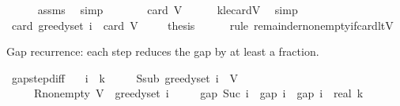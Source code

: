 \begin{isabellebody}
\ \ \ \ \isamarkupfalse%
\ assms\ \isamarkupfalse%
\ simp\isanewline
\ \ \isamarkupfalse%
\ \isamarkupfalse%
\ {\isachardoublequoteopen}{\isachardot}{\kern0pt}{\isachardot}{\kern0pt}{\isachardot}{\kern0pt}\ {\isasymle}\ card\ V{\isachardoublequoteclose}\isanewline
\ \ \ \ \isamarkupfalse%
\ k{\isacharunderscore}{\kern0pt}le{\isacharunderscore}{\kern0pt}cardV\ \isamarkupfalse%
\ simp\isanewline
\ \ \isamarkupfalse%
\ \isamarkupfalse%
\ {\isachardoublequoteopen}card\ {\isacharparenleft}{\kern0pt}greedy{\isacharunderscore}{\kern0pt}set\ i{\isacharparenright}{\kern0pt}\ {\isacharless}{\kern0pt}\ card\ V{\isachardoublequoteclose}\ \isakeywordONE{{\isachardot}{\kern0pt}}\isamarkupfalse%
\isanewline
\ \ \isamarkupfalse%
\ {\isacharquery}{\kern0pt}thesis\isanewline
\ \ \ \ \isamarkupfalse%
\ {\isacharparenleft}{\kern0pt}rule\ remainder{\isacharunderscore}{\kern0pt}nonempty{\isacharunderscore}{\kern0pt}if{\isacharunderscore}{\kern0pt}card{\isacharunderscore}{\kern0pt}ltV{\isacharparenright}{\kern0pt}\isanewline
{}\isamarkupfalse%
%
\endisatagproof
{\isafoldproof}%
%
\isadelimproof
%
\endisadelimproof
%
\begin{isamarkuptext}%
Gap recurrence: each step reduces the gap by at least a  fraction.%
\end{isamarkuptext}\isamarkuptrue%
\isamarkupfalse%
\ gap{\isacharunderscore}{\kern0pt}step{\isacharunderscore}{\kern0pt}diff{\isacharcolon}{\kern0pt}\isanewline
\ \ \ {\isachardoublequoteopen}i\ {\isacharless}{\kern0pt}\ k{\isachardoublequoteclose}\isanewline
\ \ \ \ \ S{\isacharunderscore}{\kern0pt}sub{\isacharcolon}{\kern0pt}\ {\isachardoublequoteopen}greedy{\isacharunderscore}{\kern0pt}set\ i\ {\isasymsubseteq}\ V{\isachardoublequoteclose}\isanewline
\ \ \ \ \ R{\isacharunderscore}{\kern0pt}nonempty{\isacharcolon}{\kern0pt}\ {\isachardoublequoteopen}V\ {\isacharminus}{\kern0pt}\ greedy{\isacharunderscore}{\kern0pt}set\ i\ {\isasymnoteq}\ {\isacharbraceleft}{\kern0pt}{\isacharbraceright}{\kern0pt}{\isachardoublequoteclose}\isanewline
\ \ \ {\isachardoublequoteopen}gap\ {\isacharparenleft}{\kern0pt}Suc\ i{\isacharparenright}{\kern0pt}\ {\isasymle}\ gap\ i\ {\isacharminus}{\kern0pt}\ gap\ i\ {\isacharslash}{\kern0pt}\ real\ k{\isachardoublequoteclose}\isanewline

\end{isabellebody}
